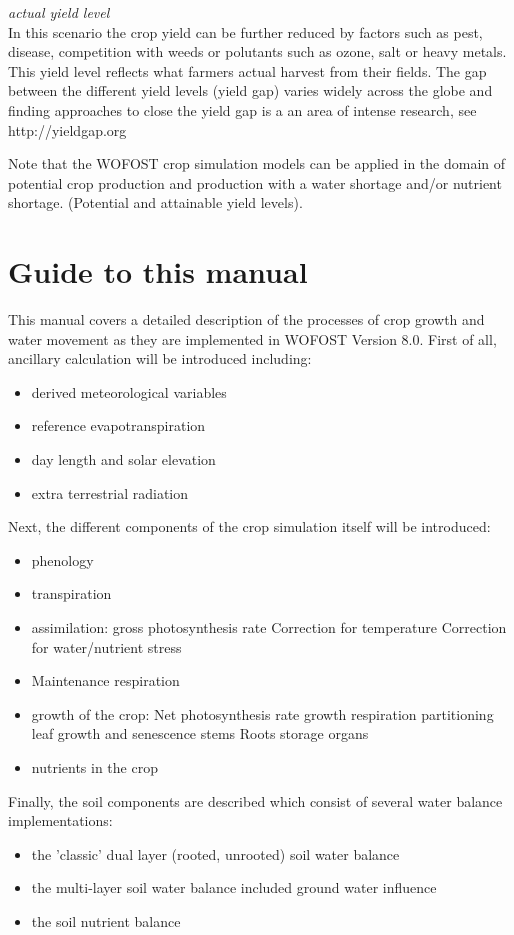{\it actual yield level\/}\\
In this scenario the crop yield can be further reduced by factors such as pest, disease, competition with weeds
or polutants such as ozone, salt or heavy metals. This yield level reflects what farmers actual
harvest from their fields. The gap between the different yield levels (yield gap) varies widely
across the globe and finding approaches to close the yield gap is a an area of intense research,
see http://yieldgap.org

Note that the WOFOST crop simulation models can be applied in the domain of potential crop
production and production with a water shortage and/or nutrient shortage.
(Potential and attainable yield levels). 


\section{Guide to this manual}

This manual covers a detailed description of the processes of crop growth and water movement as they are
implemented in WOFOST Version 8.0. First of all, ancillary calculation will be introduced including:
\begin{itemize}
	\item derived meteorological variables
	\item reference evapotranspiration
	\item day length and solar elevation
	\item extra terrestrial radiation
\end{itemize}

Next, the different components of the crop simulation itself will be introduced:
\begin{itemize}
	\item phenology
	\item transpiration
	\item assimilation:
	\subitem gross photosynthesis rate
	\subitem Correction for temperature
	\subitem Correction for water/nutrient stress
	\item Maintenance respiration
	\item growth of the crop:
	\subitem Net photosynthesis rate
	\subitem growth respiration
	\subitem partitioning
	\subitem leaf growth and senescence 
	\subitem stems
	\subitem Roots
	\subitem storage organs	
	\item nutrients in the crop
\end{itemize}

Finally, the soil components are described which consist of several
water balance implementations:
\begin{itemize}
	\item the 'classic' dual layer (rooted, unrooted) soil water balance 
	\item the multi-layer soil water balance included ground water influence
	\item the soil nutrient balance
\end{itemize}
